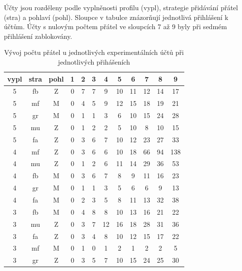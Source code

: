 \documentclass[thesis=M,czech]{FITthesis}[2013/05/10]
\begin{document}
\begin{table}[h]
	\centering
	\caption{Vývoj počtu přátel u jednotlivých experimentálních účtů při jednotlivých přihášeních}\label{tab:friendsCount}
	Účty jsou rozděleny podle vyplněnosti profilu (vypl), strategie přidávání přátel (stra) a pohlaví (pohl). Sloupce v tabulce znázorňují jednotlivá přihlášení k účtům. Účty s nulovým počtem přátel ve sloupcích 7 až 9 byly při sedmém přihlášení zablokovány.
	
    \begin{tabular}{ccc | ccccccccc}
    \textbf{vypl} & \textbf{stra} & \textbf{pohl} & \textbf{1} & \textbf{2} & \textbf{3} & \textbf{4}  & \textbf{5} & \textbf{6}  & \textbf{7}  & \textbf{8}  & \textbf{9}   \\ \hline
    5          & fb        & Z       & 0 & 7 & 7 & 9  & 10 & 11 & 12 & 14 & 17  \\
    5          & mf        & M       & 0 & 4 & 5 & 9  & 12 & 15 & 18 & 19 & 21  \\
    5          & gr        & M       & 0 & 1 & 1 & 3  & 6  & 10 & 15 & 24 & 28  \\
    5          & mu        & Z       & 0 & 1 & 2 & 2  & 5  & 10 & 8  & 10 & 15  \\
    5          & fa        & Z       & 0 & 3 & 6 & 7  & 10 & 12 & 23 & 27 & 33  \\
    4          & mf        & Z       & 0 & 3 & 6 & 6  & 10 & 18 & 66 & 94 & 138 \\
    4          & mu        & Z       & 0 & 1 & 2 & 6  & 11 & 14 & 29 & 36 & 53  \\
    4          & fb        & M       & 0 & 3 & 6 & 7  & 8  & 9  & 11 & 16 & 23  \\
    4          & gr        & M       & 0 & 1 & 1 & 3  & 5  & 6  & 6  & 9  & 13  \\
    4          & fa        & M       & 0 & 2 & 3 & 5  & 8  & 11 & 13 & 32 & 38  \\
    3          & fb        & M       & 0 & 4 & 8 & 8  & 10 & 13 & 16 & 21 & 22  \\
    3          & mu        & Z       & 0 & 3 & 7 & 12 & 16 & 18 & 28 & 31 & 36  \\
    3          & fa        & Z       & 0 & 3 & 4 & 8  & 10 & 12 & 15 & 17 & 22  \\
    3          & mf        & M       & 0 & 1 & 0 & 1  & 2  & 1  & 2  & 2  & 5   \\
    3          & gr        & Z       & 0 & 3 & 5 & 7  & 10 & 15 & 24 & 25 & 30  \\

\end{tabular}
\end{table}
\end{document}
